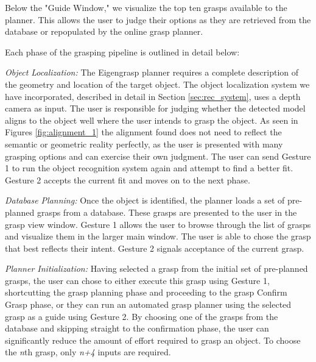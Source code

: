 Below the "Guide Window," we visualize the top ten grasps available to the planner. This allows the user to judge their options as they are retrieved from the database or repopulated by the online grasp planner. 

Each phase of the grasping pipeline is outlined in detail below:

\emph{Object Localization:} The Eigengrasp planner requires a complete description of the geometry and location of the target object. The object localization system we have incorporated, described in detail in Section \ref{sec:rec_system}, uses a depth camera as input. The user is responsible for judging whether the detected model aligns to the object well where the user intends to grasp the object. As seen in Figures \ref{fig:alignment_1} the alignment found does not need to reflect the semantic or geometric reality perfectly, as the user is presented with many grasping options and can exercise their own judgment. The user can send Gesture 1 to run the object recognition system again and attempt to find a better fit. Gesture 2 accepts the current fit and moves on to the next phase. 

\emph{Database Planning:} Once the object is identified, the planner loads a set of pre-planned grasps from a database. These grasps are presented to the user in the grasp view window. Gesture 1 allows the user to browse through the list of grasps and visualize them in the larger main window. The user is able to chose the grasp that best reflects their intent. Gesture 2 signals acceptance of the current grasp. 

\emph{Planner Initialization:} Having selected a grasp from the initial set of pre-planned grasps, the user can chose to either execute this grasp using Gesture 1, shortcutting the grasp planning phase and proceeding to the grasp Confirm Grasp phase, or they can run an automated grasp planner using the selected grasp as a guide using Gesture 2. By choosing one of the grasps from the database and skipping straight to the confirmation phase, the user can significantly reduce the amount of effort required to grasp an object. To choose the \emph{n}th grasp, only \emph{n+4} inputs are required.


